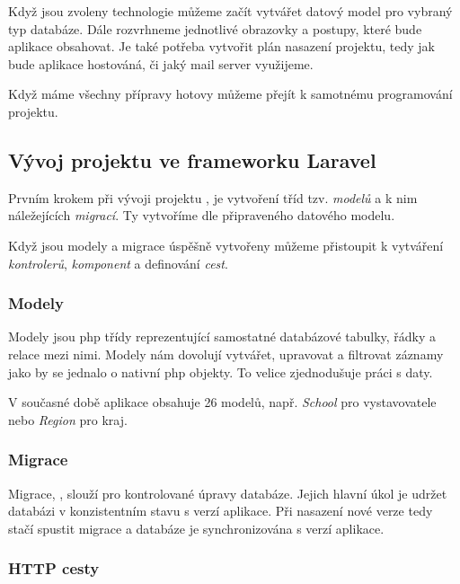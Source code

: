 Když jsou zvoleny technologie můžeme začít vytvářet datový model pro vybraný typ databáze. Dále rozvrhneme jednotlivé obrazovky a postupy, které bude aplikace obsahovat. Je také potřeba vytvořit plán nasazení projektu, tedy jak bude aplikace hostováná, či jaký mail server využijeme.

Když máme všechny přípravy hotovy můžeme přejít k samotnému programování projektu.

\subsection{Vývoj projektu ve frameworku Laravel}
\label{sub:laravel-development}

Prvním krokem při vývoji projektu \inlaravel, je vytvoření tříd tzv. \emph{modelů}\cite{laravel-models} a k nim náležejících \emph{migrací}\cite{laravel-migrations}. Ty vytvoříme dle připraveného datového modelu.

Když jsou modely a migrace úspěšně vytvořeny můžeme přistoupit k vytváření \emph{kontrolerů}\cite{laravel-controller}, \emph{komponent}\cite{laravel-blade-component} a definování \emph{cest}\cite{laravel-routes}.

\subsubsection{Modely}

Modely jsou \acrshort{php} třídy reprezentující samostatné databázové tabulky, řádky a relace mezi nimi. Modely nám dovolují vytvářet, upravovat a filtrovat záznamy jako by se jednalo o nativní \acrshort{php} objekty. To velice zjednodušuje práci s daty.

V současné době aplikace \bso obsahuje 26 modelů, např. \emph{School} pro vystavovatele nebo \emph{Region} pro kraj. 

\subsubsection{Migrace}

Migrace, \inlaravel, slouží pro kontrolované úpravy databáze. Jejich hlavní úkol je udržet databázi v konzistentním stavu s verzí aplikace. Při nasazení nové verze tedy stačí spustit migrace a databáze je synchronizována s verzí aplikace.

\subsubsection{HTTP cesty}

